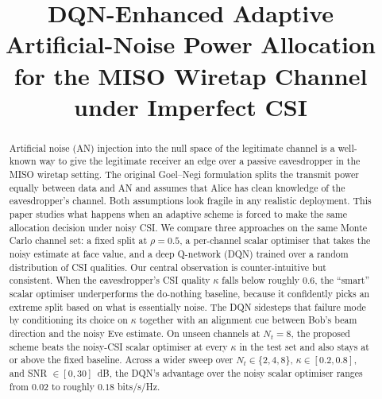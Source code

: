 \documentclass[conference]{IEEEtran}
\begin{document}
\title{DQN-Enhanced Adaptive Artificial-Noise Power Allocation for the
MISO Wiretap Channel under Imperfect CSI}

\author{
\and
{}
\and
{}
}

\maketitle

\begin{abstract}
Artificial noise (AN) injection into the null space of the legitimate
channel is a well-known way to give the legitimate receiver an edge
over a passive eavesdropper in the MISO wiretap setting. The original
Goel--Negi formulation splits the transmit power equally between data
and AN and assumes that Alice has clean knowledge of the eavesdropper's
channel. Both assumptions look fragile in any realistic deployment.
This paper studies what happens when an adaptive scheme is forced to
make the same allocation decision under noisy CSI. We compare three
approaches on the same Monte Carlo channel set: a fixed split at
$\rho = 0.5$, a per-channel scalar optimiser that takes the noisy
estimate at face value, and a deep Q-network (DQN) trained over a
random distribution of CSI qualities. Our central observation is
counter-intuitive but consistent. When the eavesdropper's CSI quality
$\kappa$ falls below roughly $0.6$, the ``smart'' scalar optimiser
underperforms the do-nothing baseline, because it confidently picks an
extreme split based on what is essentially noise. The DQN sidesteps
that failure mode by conditioning its choice on $\kappa$ together with
an alignment cue between Bob's beam direction and the noisy Eve
estimate. On unseen channels at $N_t = 8$, the proposed scheme beats
the noisy-CSI scalar optimiser at every $\kappa$ in the test set and
also stays at or above the fixed baseline. Across a wider sweep over
$N_t \in \{2,4,8\}$, $\kappa \in [0.2, 0.8]$, and SNR
$\in [0, 30]$~dB, the DQN's advantage over the noisy scalar optimiser
ranges from $0.02$ to roughly $0.18$ bits/s/Hz.
\end{abstract}
\end{document}
